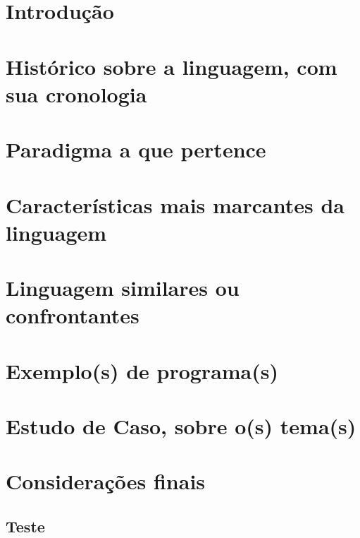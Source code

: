 \documentclass[12pt,openright,a4paper,brazil]{abntex2}
\begin{document}
 


    \frenchspacing

    \imprimircapa

    \tableofcontents*

    \textual

    \chapter{Introdução}
    \chapter{Histórico sobre a linguagem, com sua cronologia}
    \chapter{Paradigma a que pertence}
    \chapter{Características mais marcantes da linguagem}
    \chapter{Linguagem similares ou confrontantes}
    \chapter{Exemplo(s) de programa(s)}
    \chapter{Estudo de Caso, sobre o(s) tema(s)}
    \chapter{Considerações finais}

    \begin{apendicesenv}

        \partapendices
        \chapter{Teste}
    
    \end{apendicesenv}
\end{document}
